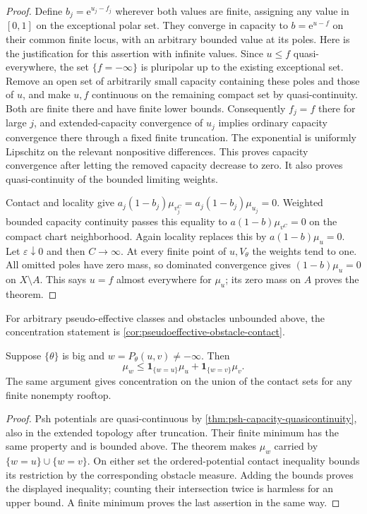 \begin{proof}
Define $b_j=\mathrm e^{u_j-f_j}$ wherever both values are finite, assigning any value in $[0,1]$ on the exceptional polar set. They converge in capacity to $b=\mathrm e^{u-f}$ on their common finite locus, with an arbitrary bounded value at its poles. Here is the justification for this assertion with infinite values. Since $u\leq f$ quasi-everywhere, the set $\{f=-\infty\}$ is pluripolar up to the existing exceptional set. Remove an open set of arbitrarily small capacity containing these poles and those of $u$, and make $u,f$ continuous on the remaining compact set by quasi-continuity. Both are finite there and have finite lower bounds. Consequently $f_j=f$ there for large $j$, and extended-capacity convergence of $u_j$ implies ordinary capacity convergence there through a fixed finite truncation. The exponential is uniformly Lipschitz on the relevant nonpositive differences. This proves capacity convergence after letting the removed capacity decrease to zero. It also proves quasi-continuity of the bounded limiting weights.

Contact and locality give $a_j(1-b_j)\mu_{v_j^C}=a_j(1-b_j)\mu_{u_j}=0$. Weighted bounded capacity continuity passes this equality to
$a(1-b)\mu_{v^C}=0$ on the compact chart neighborhood. Again locality replaces this by $a(1-b)\mu_u=0$. Let $\varepsilon\downarrow0$ and then $C\to\infty$. At every finite point of $u,V_\theta$ the weights tend to one. All omitted poles have zero mass, so dominated convergence gives $(1-b)\mu_u=0$ on $X\setminus A$. This says $u=f$ almost everywhere for $\mu_u$; its zero mass on $A$ proves the theorem.
\end{proof}
For arbitrary pseudo-effective classes and obstacles unbounded above, the concentration statement is \cref{cor:pseudoeffective-obstacle-contact}.

\begin{corollary}\label{cor:rooftop-contact-inequality}
Suppose $\{\theta\}$ is big and $w=P_\theta(u,v)\ne-\infty$. Then
\[
 \mu_w\leq\mathbf1_{\{w=u\}}\mu_u
                       +\mathbf1_{\{w=v\}}\mu_v.
\]
The same argument gives concentration on the union of the contact sets for any finite nonempty rooftop.
\end{corollary}
\begin{proof}
Psh potentials are quasi-continuous by \cref{thm:psh-capacity-quasicontinuity}, also in the extended topology after truncation. Their finite minimum has the same property and is bounded above. The theorem makes $\mu_w$ carried by $\{w=u\}\cup\{w=v\}$. On either set the ordered-potential contact inequality bounds its restriction by the corresponding obstacle measure. Adding the bounds proves the displayed inequality; counting their intersection twice is harmless for an upper bound. A finite minimum proves the last assertion in the same way.
\end{proof}

